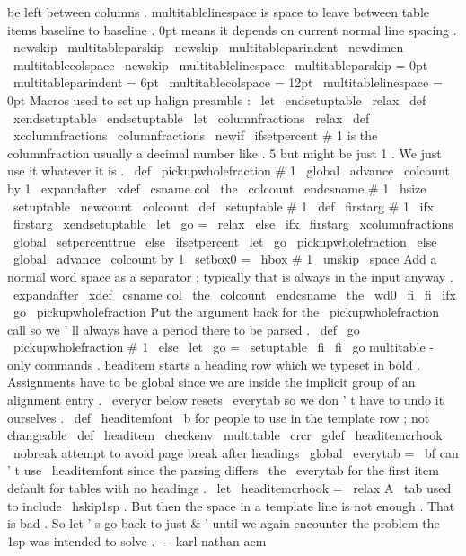 {{{{be
left
between
columns
.
%
multitablelinespace
is
space
to
leave
between
table
items
baseline
%
to
baseline
.
%
0pt
means
it
depends
on
current
normal
line
spacing
.
%
\
newskip
\
multitableparskip
\
newskip
\
multitableparindent
\
newdimen
\
multitablecolspace
\
newskip
\
multitablelinespace
\
multitableparskip
=
0pt
\
multitableparindent
=
6pt
\
multitablecolspace
=
12pt
\
multitablelinespace
=
0pt
%
Macros
used
to
set
up
halign
preamble
:
%
\
let
\
endsetuptable
\
relax
\
def
\
xendsetuptable
{
\
endsetuptable
}
\
let
\
columnfractions
\
relax
\
def
\
xcolumnfractions
{
\
columnfractions
}
\
newif
\
ifsetpercent
%
#
1
is
the
columnfraction
usually
a
decimal
number
like
.
5
but
might
%
be
just
1
.
We
just
use
it
whatever
it
is
.
%
\
def
\
pickupwholefraction
#
1
{
%
\
global
\
advance
\
colcount
by
1
\
expandafter
\
xdef
\
csname
col
\
the
\
colcount
\
endcsname
{
#
1
\
hsize
}
%
\
setuptable
}
\
newcount
\
colcount
\
def
\
setuptable
#
1
{
%
\
def
\
firstarg
{
#
1
}
%
\
ifx
\
firstarg
\
xendsetuptable
\
let
\
go
=
\
relax
\
else
\
ifx
\
firstarg
\
xcolumnfractions
\
global
\
setpercenttrue
\
else
\
ifsetpercent
\
let
\
go
\
pickupwholefraction
\
else
\
global
\
advance
\
colcount
by
1
\
setbox0
=
\
hbox
{
#
1
\
unskip
\
space
}
%
Add
a
normal
word
space
as
a
%
separator
;
typically
that
is
always
in
the
input
anyway
.
\
expandafter
\
xdef
\
csname
col
\
the
\
colcount
\
endcsname
{
\
the
\
wd0
}
%
\
fi
\
fi
\
ifx
\
go
\
pickupwholefraction
%
Put
the
argument
back
for
the
\
pickupwholefraction
call
so
%
we
'
ll
always
have
a
period
there
to
be
parsed
.
\
def
\
go
{
\
pickupwholefraction
#
1
}
%
\
else
\
let
\
go
=
\
setuptable
\
fi
%
\
fi
\
go
}
%
multitable
-
only
commands
.
%
%
headitem
starts
a
heading
row
which
we
typeset
in
bold
.
Assignments
%
have
to
be
global
since
we
are
inside
the
implicit
group
of
an
%
alignment
entry
.
\
everycr
below
resets
\
everytab
so
we
don
'
t
have
to
%
undo
it
ourselves
.
\
def
\
headitemfont
{
\
b
}
%
for
people
to
use
in
the
template
row
;
not
changeable
\
def
\
headitem
{
%
\
checkenv
\
multitable
\
crcr
\
gdef
\
headitemcrhook
{
\
nobreak
}
%
attempt
to
avoid
page
break
after
headings
\
global
\
everytab
=
{
\
bf
}
%
can
'
t
use
\
headitemfont
since
the
parsing
differs
\
the
\
everytab
%
for
the
first
item
}
%
%
%
default
for
tables
with
no
headings
.
\
let
\
headitemcrhook
=
\
relax
%
%
A
\
tab
used
to
include
\
hskip1sp
.
But
then
the
space
in
a
template
%
line
is
not
enough
.
That
is
bad
.
So
let
'
s
go
back
to
just
&
'
until
%
we
again
encounter
the
problem
the
1sp
was
intended
to
solve
.
%
-
-
karl
nathan
acm
}}}}
